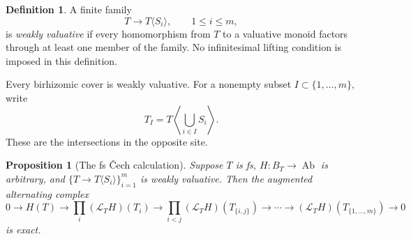 \documentclass[11pt]{article}
\newtheorem{proposition}[theorem]{Proposition}
\theoremstyle{definition}
\newtheorem{definition}[theorem]{Definition}
\theoremstyle{remark}
\DeclareMathOperator{\Ab}{Ab}
\newcommand{\LL}{\mathcal L}
\begin{document}
\begin{definition}\label{def:weak}
A finite family
\[
T\longrightarrow T\langle S_i\rangle,\qquad 1\le i\le m,
\]
is \emph{weakly valuative} if every homomorphism from \(T\) to a
valuative monoid factors through at least one member of the
family. No infinitesimal lifting condition is imposed in this
definition.
\end{definition}

Every birhizomic cover is weakly valuative. For a nonempty subset
\(I\subset\{1,\ldots,m\}\), write
\[
T_I=T\left\langle\bigcup_{i\in I}S_i\right\rangle.
\]
These are the intersections in the opposite site.

\begin{proposition}[The fs \v{C}ech calculation]\label{prop:fs-cech}
Suppose \(T\) is fs, \(H:B_T\to\Ab\) is arbitrary, and
\(\{T\to T\langle S_i\rangle\}_{i=1}^m\) is weakly valuative.
Then the augmented alternating complex
\begin{equation}\label{eq:cech}
0\longrightarrow H(T)
\longrightarrow \prod_i(\LL_TH)(T_i)
\longrightarrow \prod_{i<j}(\LL_TH)(T_{\{i,j\}})
\longrightarrow\cdots
\longrightarrow(\LL_TH)(T_{\{1,\ldots,m\}})
\longrightarrow0
\end{equation}
is exact.
\end{proposition}
\end{document}
